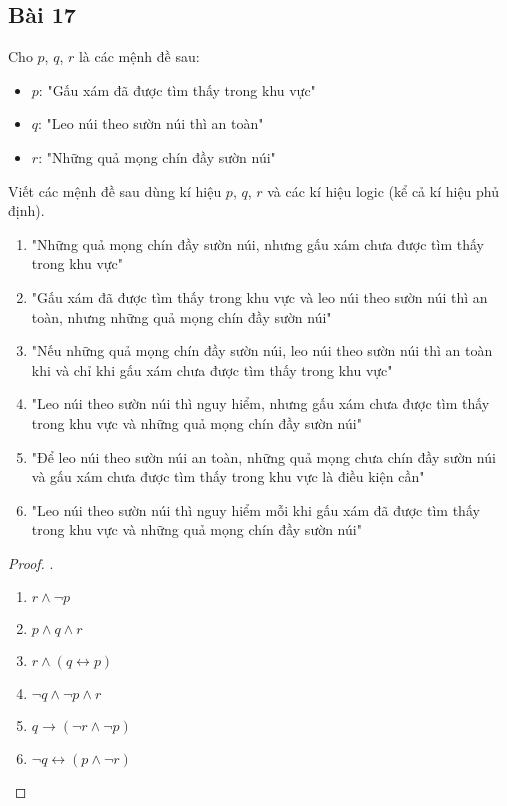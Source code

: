 \subsection*{Bài 17}
Cho $p$, $q$, $r$ là các mệnh đề sau: \begin{itemize}
    \item $p$: "Gấu xám đã được tìm thấy trong khu vực"
    \item $q$: "Leo núi theo sườn núi thì an toàn"
    \item $r$: "Những quả mọng chín đầy sườn núi"
\end{itemize}
Viết các mệnh đề sau dùng kí hiệu $p$, $q$, $r$ và các kí hiệu logic (kể cả kí hiệu phủ định).
\begin{enumerate}[label=\alph*)]
    \item "Những quả mọng chín đầy sườn núi, nhưng gấu xám chưa được tìm thấy trong khu vực"
    \item "Gấu xám đã được tìm thấy trong khu vực và leo núi theo sườn núi thì an toàn, nhưng những quả mọng chín đầy sườn núi"
    \item "Nếu những quả mọng chín đầy sườn núi, leo núi theo sườn núi thì an toàn khi và chỉ khi gấu xám chưa được tìm thấy trong khu vực"
    \item "Leo núi theo sườn núi thì nguy hiểm, nhưng gấu xám chưa được tìm thấy trong khu vực và những quả mọng chín đầy sườn núi"
    \item "Để leo núi theo sườn núi an toàn, những quả mọng chưa chín đầy sườn núi và gấu xám chưa được tìm thấy trong khu vực là điều kiện cần"
    \item "Leo núi theo sườn núi thì nguy hiểm mỗi khi gấu xám đã được tìm thấy trong khu vực và những quả mọng chín đầy sườn núi"
\end{enumerate}
\begin{proof}.
    \begin{multicols}{3}
        \begin{enumerate}[label=\alph*)]
            \item $r\land\neg p$
            \item $p\land q\land r$
            \item $r\land (q\leftrightarrow p)$
            \item $\neg q\land \neg p\land r$
            \item $q\rightarrow (\neg r\land \neg p)$
            \item $\neg q\leftrightarrow (p\land\neg r)$
        \end{enumerate}
    \end{multicols}
\end{proof}
